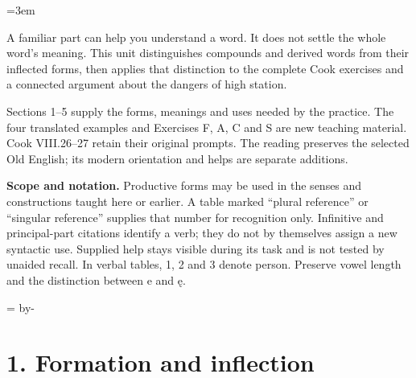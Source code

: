 \newcommand{\runningtitle}{Unit 14. Word formation and lexical families}

\emergencystretch=3em
\newcommand{\itempara}[2]{\par\addvspace{3pt}\noindent\hangindent=1.8em\hangafter=1\makebox[1.8em][l]{#1.}#2\par}
\newcommand{\reserve}[1]{\par\penalty-100\begingroup\dimen0=\pagegoal\advance\dimen0 by-\pagetotal\ifdim\dimen0<#1\newpage\fi\endgroup}

\raggedright
{}

A familiar part can help you understand a word. It does not settle the whole word’s meaning. This unit distinguishes compounds and derived words from their inflected forms, then applies that distinction to the complete Cook exercises and a connected argument about the dangers of high station.

Sections 1–5 supply the forms, meanings and uses needed by the practice. The four translated examples and Exercises F, A, C and S are new teaching material. Cook VIII.26–27 retain their original prompts. The reading preserves the selected Old English; its modern orientation and helps are separate additions.

\textbf{Scope and notation.} Productive forms may be used in the senses and constructions taught here or earlier. A table marked “plural reference” or “singular reference” supplies that number for recognition only. Infinitive and principal-part citations identify a verb; they do not by themselves assign a new syntactic use. Supplied help stays visible during its task and is not tested by unaided recall. In verbal tables, 1, 2 and 3 denote person. Preserve vowel length and the distinction between e and ę.

\reserve{7\baselineskip}
\section*{1. Formation and inflection}

